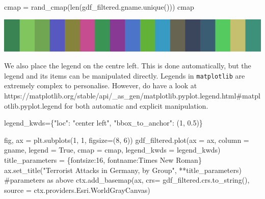\documentclass[
  letterpaper,
  DIV=11,
  numbers=noendperiod]{scrreprt}
\newenvironment{Shaded}{\begin{snugshade}}{\end{snugshade}}
\newcommand{\BuiltInTok}[1]{\textcolor[rgb]{0.00,0.23,0.31}{#1}}
\newcommand{\CommentTok}[1]{\textcolor[rgb]{0.37,0.37,0.37}{#1}}
\newcommand{\DecValTok}[1]{\textcolor[rgb]{0.68,0.00,0.00}{#1}}
\newcommand{\FloatTok}[1]{\textcolor[rgb]{0.68,0.00,0.00}{#1}}
\newcommand{\NormalTok}[1]{\textcolor[rgb]{0.00,0.23,0.31}{#1}}
\newcommand{\OperatorTok}[1]{\textcolor[rgb]{0.37,0.37,0.37}{#1}}
\newcommand{\StringTok}[1]{\textcolor[rgb]{0.13,0.47,0.30}{#1}}
\newcommand{\VariableTok}[1]{\textcolor[rgb]{0.07,0.07,0.07}{#1}}
\begin{document}
\begin{Shaded}
\begin{Highlighting}[]
\NormalTok{cmap }\OperatorTok{=}\NormalTok{ rand\_cmap(}\BuiltInTok{len}\NormalTok{(gdf\_filtered.gname.unique()))}
\NormalTok{cmap}
\end{Highlighting}
\end{Shaded}

\includegraphics{labs/w02_maps_files/figure-pdf/cell-45-output-1.png}

We also place the legend on the centre left. This is done automatically,
but the legend and its items can be manipulated directly. Legends in
\texttt{matplotlib} are extremely complex to personalise. However, do
have a look at
https://matplotlib.org/stable/api/\_as\_gen/matplotlib.pyplot.legend.html\#matplotlib.pyplot.legend
for both automatic and explicit manipulation.

\begin{Shaded}
\begin{Highlighting}[]
\NormalTok{legend\_kwds}\OperatorTok{=}\NormalTok{\{}\StringTok{"loc"}\NormalTok{: }\StringTok{"center left"}\NormalTok{, }\StringTok{"bbox\_to\_anchor"}\NormalTok{: (}\DecValTok{1}\NormalTok{, }\FloatTok{0.5}\NormalTok{)\}}
\end{Highlighting}
\end{Shaded}

\begin{Shaded}
\begin{Highlighting}[]
\NormalTok{fig, ax }\OperatorTok{=}\NormalTok{ plt.subplots(}\DecValTok{1}\NormalTok{, }\DecValTok{1}\NormalTok{, figsize}\OperatorTok{=}\NormalTok{(}\DecValTok{8}\NormalTok{, }\DecValTok{6}\NormalTok{))}
\NormalTok{gdf\_filtered.plot(ax }\OperatorTok{=}\NormalTok{ ax, column }\OperatorTok{=} \StringTok{\textquotesingle{}gname\textquotesingle{}}\NormalTok{, legend }\OperatorTok{=} \VariableTok{True}\NormalTok{, cmap }\OperatorTok{=}\NormalTok{ cmap, legend\_kwds }\OperatorTok{=}\NormalTok{ legend\_kwds)}
\NormalTok{title\_parameters }\OperatorTok{=}\NormalTok{ \{}\StringTok{\textquotesingle{}fontsize\textquotesingle{}}\NormalTok{:}\StringTok{\textquotesingle{}16\textquotesingle{}}\NormalTok{, }\StringTok{\textquotesingle{}fontname\textquotesingle{}}\NormalTok{:}\StringTok{\textquotesingle{}Times New Roman\textquotesingle{}}\NormalTok{\}}
\NormalTok{ax.set\_title(}\StringTok{"Terrorist Attacks in Germany, by Group"}\NormalTok{, }\OperatorTok{**}\NormalTok{title\_parameters) }\CommentTok{\#parameters as above}
\NormalTok{ctx.add\_basemap(ax, crs}\OperatorTok{=}\NormalTok{ gdf\_filtered.crs.to\_string(), source }\OperatorTok{=}\NormalTok{ ctx.providers.Esri.WorldGrayCanvas)}
\end{Highlighting}
\end{Shaded}
\end{document}
